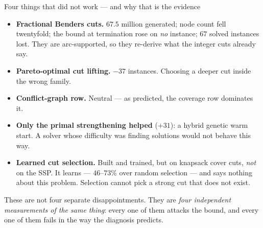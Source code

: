 \documentclass[11pt,aspectratio=169]{beamer}
\newcommand{\keyline}[1]{\vspace{0.4em}{\color{cRule}\rule{\textwidth}{0.4pt}}\vspace{0.3em}\par#1}
\begin{document}
\begin{frame}{Four things that did not work --- and why that is the evidence}
\vspace{0.1em}
\begin{itemize}\itemsep4pt\small
  \item \textbf{Fractional Benders cuts.} $67.5$ million generated; node count fell
  twentyfold; the bound at termination rose on \emph{no} instance; $67$ solved instances
  lost.
  \hfill{\color{cGrey}\scriptsize They are arc-supported, so they re-derive what the integer cuts already say.}
  \item \textbf{Pareto-optimal cut lifting.} $-37$ instances.
  \hfill{\color{cGrey}\scriptsize Choosing a deeper cut inside the wrong family.}
  \item \textbf{Conflict-graph row.} Neutral --- as predicted, the coverage row dominates it.
  \item \textbf{Only the primal strengthening helped} ($+31$): a hybrid genetic warm start.
  \hfill{\color{cGrey}\scriptsize A solver whose difficulty was finding solutions would not behave this way.}
  \item \textbf{Learned cut selection.} Built and trained, but on knapsack cover cuts,
  \emph{not} on the SSP. It learns --- $46$--$73\%$ over random selection --- and says
  nothing about this problem.
  \hfill{\color{cGrey}\scriptsize Selection cannot pick a strong cut that does not exist.}
\end{itemize}
\vspace{0.2em}
\keyline{}
\centering\small
These are not four separate disappointments. They are \emph{four independent
measurements of the same thing}: every one of them attacks the bound, and every one of
them fails in the way the diagnosis predicts.
\end{frame}
\end{document}
